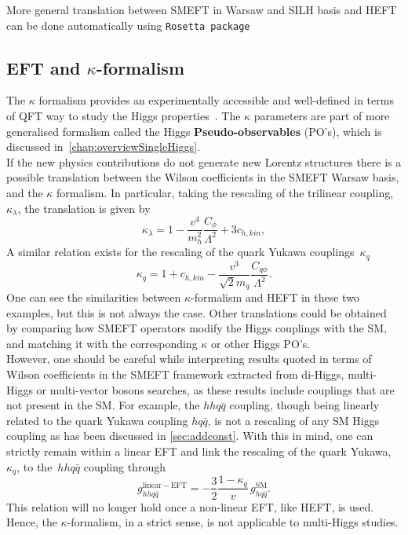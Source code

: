 More general translation between SMEFT in Warsaw and SILH basis and HEFT can be done automatically using \texttt{Rosetta package}~\cite{Falkowski:2015wza}
\subsection{EFT and $\kappa$-formalism \label{eftkappa}}
The $\kappa$ formalism provides an experimentally accessible and well-defined in terms of QFT way to study the Higgs properties~\cite{Gonzalez-Alonso:2014eva}. The $\kappa$ parameters are part of more generalised formalism called the Higgs \textbf{Pseudo-observables} (PO's), which is discussed in~\autoref{chap:overviewSingleHiggs}.\\ 
 If the new physics contributions do not generate new Lorentz structures there is a possible translation between the Wilson coefficients in the SMEFT Warsaw basis, and the $\kappa$ formalism. In particular, taking the rescaling of the trilinear coupling, $\kappa_\lambda$, the translation is given by
 \begin{equation}
	     \kappa_\lambda = 1-\frac{v^4}{m_h^2} \frac{C_\phi}{\Lambda^2}+3 c_{h,kin},
	 \end{equation}
 A similar relation exists for the rescaling of the quark Yukawa couplings~$\kappa_q$
 \begin{equation}
	   \kappa_q = 1+c_{h,kin}- \frac{v^3}{\sqrt{2}m_q}\frac{C_{q\phi}}{\Lambda^2}.
	 \end{equation}
One can see the similarities between $\kappa$-formalism and HEFT in these two examples, but this is not always the case.  Other translations could be obtained by comparing how SMEFT operators modify the Higgs couplings with the SM, and matching it with the corresponding $\kappa$ or other Higgs PO's.\\ 
 However, one should be careful while interpreting results quoted in terms of Wilson coefficients in the SMEFT framework extracted from di-Higgs, multi-Higgs or multi-vector bosons searches, as these results include couplings that are not present in the SM. For example, the $hh q\bar{q}$ coupling, though being linearly related to the quark Yukawa coupling $h q\bar{q}$, is not a rescaling of any SM Higgs coupling as has been discussed in \autoref{sec:addconst}. With this in mind, one can strictly remain within a linear EFT and link the rescaling of the quark Yukawa, $\kappa_q$, to the~$hh q\bar{q}$ coupling through
 \begin{equation}
	   g_{hhq\bar{q}}^{\mathrm{linear-EFT}} = -\frac{3}{2}\frac{1-\kappa_q}{v} \, g_{h q\bar{q}}^{\mathrm{SM}}.
	 \end{equation}
 This relation will no longer hold once a non-linear EFT, like HEFT, is used. Hence, the $\kappa$-formalism, in a strict sense, is not applicable to multi-Higgs studies.

